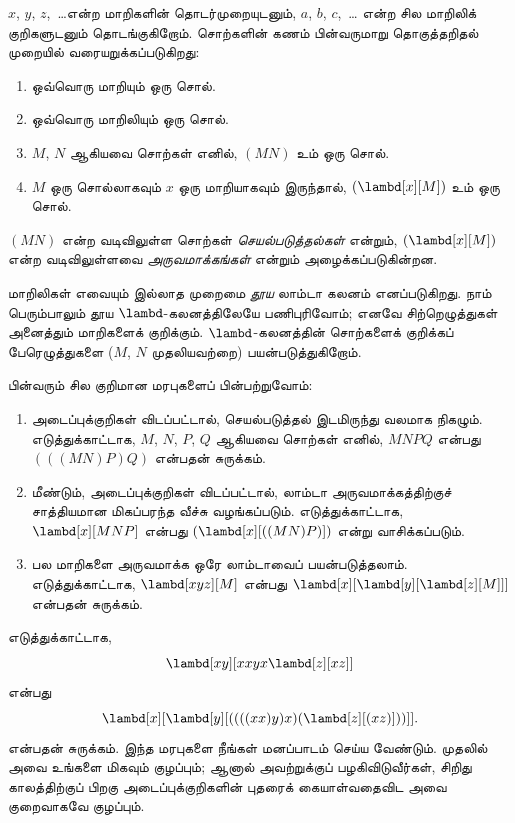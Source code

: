 \documentclass[../../../include/open-logic-section]{subfiles}
\begin{document}

$x$, $y$, $z$,~\dots என்ற மாறிகளின் தொடர்முறையுடனும், $a$, $b$, $c$,~\dots
என்ற சில மாறிலிக் குறிகளுடனும் தொடங்குகிறோம். சொற்களின் கணம் பின்வருமாறு
தொகுத்தறிதல் முறையில் வரையறுக்கப்படுகிறது:
\begin{enumerate}
\item ஒவ்வொரு மாறியும் ஒரு சொல்.
\item ஒவ்வொரு மாறிலியும் ஒரு சொல்.
\item $M$, $N$ ஆகியவை சொற்கள் எனில், $(MN)$ உம் ஒரு சொல்.
\item $M$ ஒரு சொல்லாகவும் $x$ ஒரு மாறியாகவும் இருந்தால்,
  $(\lambd[x][M])$ உம் ஒரு சொல்.
\end{enumerate}
$(MN)$ என்ற வடிவிலுள்ள சொற்கள் \emph{செயல்படுத்தல்கள்} என்றும்,
$(\lambd[x][M])$ என்ற வடிவிலுள்ளவை \emph{அருவமாக்கங்கள்} என்றும் அழைக்கப்படுகின்றன.

மாறிலிகள் எவையும் இல்லாத முறைமை \emph{தூய} லாம்டா கலனம் எனப்படுகிறது. நாம்
பெரும்பாலும் தூய $\lambd$-கலனத்திலேயே பணிபுரிவோம்; எனவே சிற்றெழுத்துகள் அனைத்தும்
மாறிகளைக் குறிக்கும். $\lambd$-கலனத்தின் சொற்களைக் குறிக்கப் பேரெழுத்துகளை
($M$, $N$ முதலியவற்றை) பயன்படுத்துகிறோம்.

பின்வரும் சில குறிமான மரபுகளைப் பின்பற்றுவோம்:

\begin{conv}
\begin{enumerate}
\item அடைப்புக்குறிகள் விடப்பட்டால், செயல்படுத்தல் இடமிருந்து வலமாக நிகழும்.
  எடுத்துக்காட்டாக, $M$, $N$, $P$, $Q$ ஆகியவை சொற்கள் எனில், $MNPQ$ என்பது
  $(((MN)P)Q)$ என்பதன் சுருக்கம்.
\item மீண்டும், அடைப்புக்குறிகள் விடப்பட்டால், லாம்டா அருவமாக்கத்திற்குச்
  சாத்தியமான மிகப்பரந்த வீச்சு வழங்கப்படும். எடுத்துக்காட்டாக,
  $\lambd[x][MNP]$ என்பது $(\lambd[x][((MN)P)])$ என்று வாசிக்கப்படும்.
\item பல மாறிகளை அருவமாக்க ஒரே லாம்டாவைப் பயன்படுத்தலாம். எடுத்துக்காட்டாக,
  $\lambd[xyz][M]$ என்பது
  $\lambd[x][\lambd[y][\lambd[z][M]]]$ என்பதன் சுருக்கம்.
\end{enumerate}
\end{conv}

எடுத்துக்காட்டாக,
\[
\lambd[xy][xxyx \lambd[z][xz]]
\]
என்பது
\[
\lambd[x][\lambd[y][((((xx)y)x)(\lambd[z][(xz)]))]].
\]
என்பதன் சுருக்கம். இந்த மரபுகளை நீங்கள் மனப்பாடம் செய்ய வேண்டும். முதலில் அவை
உங்களை மிகவும் குழப்பும்; ஆனால் அவற்றுக்குப் பழகிவிடுவீர்கள், சிறிது காலத்திற்குப்
பிறகு அடைப்புக்குறிகளின் புதரைக் கையாள்வதைவிட அவை குறைவாகவே குழப்பும்.
\end{document}
